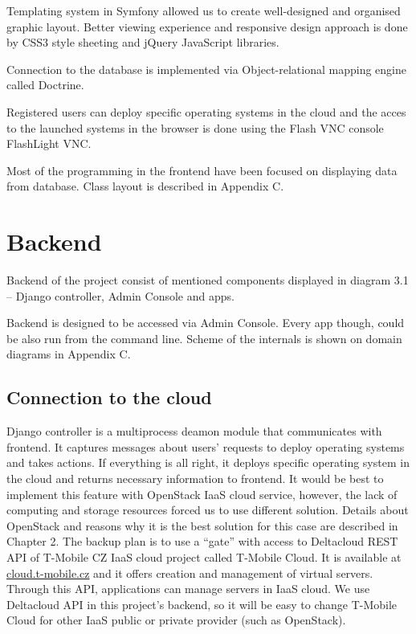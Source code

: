 \documentclass[thesis=B,english]{FITthesis}[2013/04/26]
\begin{document}
Templating system in Symfony allowed us to create well-designed and organised graphic layout. Better viewing experience and responsive design approach is done by CSS3 style sheeting and jQuery JavaScript libraries.

Connection to the database is implemented via Object-relational mapping engine called Doctrine.

Registered users can deploy specific operating systems in the cloud and the acces to the launched systems in the browser is done using the Flash VNC console FlashLight VNC.

Most of the programming in the frontend have been focused on displaying data from database. Class layout is described in Appendix C.

\section{Backend}

Backend of the project consist of mentioned components displayed in diagram 3.1 -- Django controller, Admin Console and apps.

Backend is designed to be accessed via Admin Console. Every app though, could be also run from the command line. Scheme of the internals is shown on domain diagrams in Appendix C.

\subsection{Connection to the cloud}

Django controller is a multiprocess deamon module that communicates with frontend. It captures messages about users' requests to deploy operating systems and takes actions. If everything is all right, it deploys specific operating system in the cloud and returns necessary information to frontend. It would be best to implement this feature with OpenStack IaaS cloud service, however, the lack of computing and storage resources forced us to use different solution. Details about OpenStack and reasons why it is the best solution for this case are described in Chapter 2. The backup plan is to use a ``gate'' with access to Deltacloud REST API of T-Mobile CZ IaaS cloud project called T-Mobile Cloud. It is available at \url{cloud.t-mobile.cz} and it offers creation and management of virtual servers. Through this API, applications can manage servers in IaaS cloud. We use Deltacloud API in this project's backend, so it will be easy to change T-Mobile Cloud for other IaaS public or private provider (such as OpenStack).
\end{document}
